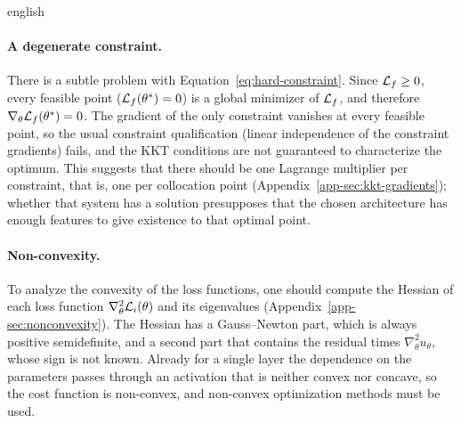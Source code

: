 \documentclass[../0000.tex]{subfiles}
\begin{document}
\begin{hyphenrules}{english}
\paragraph{A degenerate constraint.}
There is a subtle problem with Equation~\eqref{eq:hard-constraint}. Since $\mathcal{L}_f\ge0$, every feasible point
($\mathcal{L}_f(\theta^{*})=0$) is a global minimizer of $\mathcal{L}_f$, and therefore $\nabla_\theta\mathcal{L}_f(\theta^{*})=0$.
The gradient of the only constraint vanishes at every feasible point, so the usual constraint
qualification (linear independence of the constraint gradients) fails, and the KKT conditions are not
guaranteed to characterize the optimum. This suggests that there should be one Lagrange multiplier per constraint, that is,
one per collocation point (Appendix~\ref{app-sec:kkt-gradients}); whether that system has a solution
presupposes that the chosen architecture has enough features to give existence to that optimal point.

\paragraph{Non-convexity.}
To analyze the convexity of the loss functions, one should compute the Hessian of each loss function
$\nabla^2_\theta\mathcal{L}_i(\theta)$ and its eigenvalues (Appendix~\ref{app-sec:nonconvexity}). The Hessian has
a Gauss--Newton part, which is always positive semidefinite, and a second part that contains the
residual times $\nabla^2_\theta u_\theta$, whose sign is not known. Already for a single layer the
dependence on the parameters passes through an activation that is neither convex nor concave, so the
cost function is non-convex, and non-convex optimization methods must be used.


\end{hyphenrules}
\end{document}
